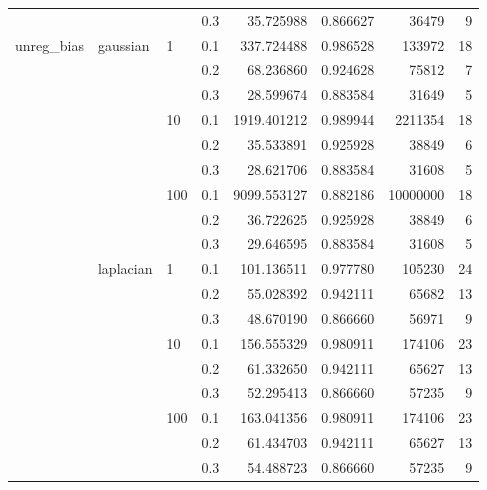 \begin{table}[H]
\begin{tabular}{llllrrrr}
           &           &     & 0.3 &    35.725988 &  0.866627 &     36479 &     9 \\
unreg\_bias & gaussian & 1   & 0.1 &   337.724488 &  0.986528 &    133972 &    18 \\
           &           &     & 0.2 &    68.236860 &  0.924628 &     75812 &     7 \\
           &           &     & 0.3 &    28.599674 &  0.883584 &     31649 &     5 \\
           &           & 10  & 0.1 &  1919.401212 &  0.989944 &   2211354 &    18 \\
           &           &     & 0.2 &    35.533891 &  0.925928 &     38849 &     6 \\
           &           &     & 0.3 &    28.621706 &  0.883584 &     31608 &     5 \\
           &           & 100 & 0.1 &  9099.553127 &  0.882186 &  10000000 &    18 \\
           &           &     & 0.2 &    36.722625 &  0.925928 &     38849 &     6 \\
           &           &     & 0.3 &    29.646595 &  0.883584 &     31608 &     5 \\
           & laplacian & 1   & 0.1 &   101.136511 &  0.977780 &    105230 &    24 \\
           &           &     & 0.2 &    55.028392 &  0.942111 &     65682 &    13 \\
           &           &     & 0.3 &    48.670190 &  0.866660 &     56971 &     9 \\
           &           & 10  & 0.1 &   156.555329 &  0.980911 &    174106 &    23 \\
           &           &     & 0.2 &    61.332650 &  0.942111 &     65627 &    13 \\
           &           &     & 0.3 &    52.295413 &  0.866660 &     57235 &     9 \\
           &           & 100 & 0.1 &   163.041356 &  0.980911 &    174106 &    23 \\
           &           &     & 0.2 &    61.434703 &  0.942111 &     65627 &    13 \\
           &           &     & 0.3 &    54.488723 &  0.866660 &     57235 &     9 \\
\bottomrule
\end{tabular}
\end{table}
